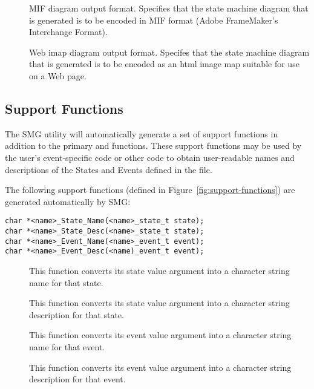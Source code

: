 \begin{description}
\item[] MIF diagram output format.  Specifies that the state
  machine diagram that is generated is to be encoded in MIF format
  (Adobe FrameMaker's Interchange Format).
         
\item[] Web imap diagram output format.  Specifes that the
  state machine diagram that is generated is to be encoded as an html
  image map suitable for use on a Web page.

\end{description}


\subsection{Support Functions}

The SMG utility will automatically generate a set of support functions
in addition to the primary  and
 functions.  These support functions
may be used by the user's event-specific code or other code to obtain
user-readable names and descriptions of the States and Events defined
in the  file.

The following support functions (defined in
Figure~\ref{fig:support-functions}) are generated automatically by
SMG:

\begin{figure*}
\begin{verbatim}
char *<name>_State_Name(<name>_state_t state);
char *<name>_State_Desc(<name>_state_t state);
char *<name>_Event_Name(<name>_event_t event);
char *<name>_Event_Desc(<name)_event_t event);
\end{verbatim}
\caption{SMG Auto-generated Support Functions}\label{fig:support-functions}
\end{figure*}

\begin{description}
\item[] This function converts its state value
  argument into a character string name for that state.
\item[] This function converts its state value
  argument into a character string description for that state.
\item[] This function converts its event value
  argument into a character string name for that event.
\item[] This function converts its event value
  argument into a character string description for that event.
\end{description}

